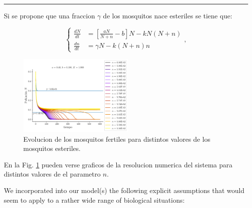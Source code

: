 \documentclass[twocolumn,aps,prl]{revtex4-1}
\newcommand*\sepline{%
  \begin{center}
    \rule[1ex]{.5\textwidth}{.5pt}
  \end{center}}
\begin{document}
\sepline

Si se propone que una fraccion $\gamma$ de los mosquitos nace esteriles se tiene que:

\begin{equation}
    \left\lbrace
    \begin{aligned}
        \frac{d N}{d t}&=\left[\frac{a N}{N+n}-b\right] N- k N(N+n) \\
        \frac{d n}{d t}&=  \gamma N - k (N+n) n
    \end{aligned}
    \right. ,
\end{equation}

\begin{figure}
    \centering
    \includegraphics[width=0.51\textwidth]{figuras/ex02.pdf}
    \caption{Evolucion de los mosquitos fertiles para distintos valores de los mosquitos esteriles.}
    \label{fig:esteriles}
\end{figure}

En la Fig. \ref{fig:esteriles} pueden verse graficos de la resolucion numerica del sistema para distintos valores de el parametro $n$.

We incorporated into our model(s) the following explicit assumptions that would seem to apply to a rather wide range of biological situations: 
\end{document}
